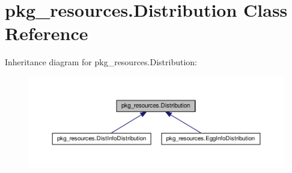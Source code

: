 \hypertarget{classpkg__resources_1_1Distribution}{}\section{pkg\+\_\+resources.\+Distribution Class Reference}
\label{classpkg__resources_1_1Distribution}


Inheritance diagram for pkg\+\_\+resources.\+Distribution\+:
\nopagebreak
\begin{figure}[H]
\begin{center}
\leavevmode
\includegraphics[width=350pt]{classpkg__resources_1_1Distribution__inherit__graph}
\end{center}
\end{figure}
